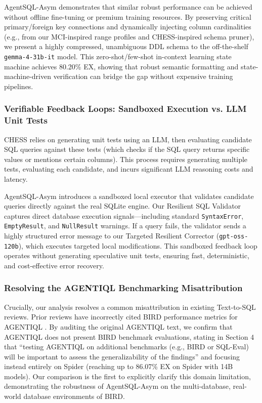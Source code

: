 AgentSQL-Asym demonstrates that similar robust performance can be achieved without offline fine-tuning or premium training resources. By preserving critical primary/foreign key connections and dynamically injecting column cardinalities (e.g., from our MCI-inspired range profiles and CHESS-inspired schema pruner), we present a highly compressed, unambiguous DDL schema to the off-the-shelf \texttt{gemma-4-31b-it} model. This zero-shot/few-shot in-context learning state machine achieves 80.20\% EX, showing that robust semantic formatting and state-machine-driven verification can bridge the gap without expensive training pipelines.

\subsubsection{Verifiable Feedback Loops: Sandboxed Execution vs. LLM Unit Tests}
CHESS \cite{talaei_chess_2024} relies on generating unit tests using an LLM, then evaluating candidate SQL queries against these tests (which checks if the SQL query returns specific values or mentions certain columns). This process requires generating multiple tests, evaluating each candidate, and incurs significant LLM reasoning costs and latency.

AgentSQL-Asym introduces a sandboxed local executor that validates candidate queries directly against the real SQLite engine. Our Resilient SQL Validator captures direct database execution signals---including standard \texttt{SyntaxError}, \texttt{EmptyResult}, and \texttt{NullResult} warnings. If a query fails, the validator sends a highly structured error message to our Targeted Resilient Corrector (\texttt{gpt-oss-120b}), which executes targeted local modifications. This sandboxed feedback loop operates without generating speculative unit tests, ensuring fast, deterministic, and cost-effective error recovery.

\subsubsection{Resolving the AGENTIQL Benchmarking Misattribution}
Crucially, our analysis resolves a common misattribution in existing Text-to-SQL reviews. Prior reviews have incorrectly cited BIRD performance metrics for AGENTIQL \cite{heidari_agentiql_2025}. By auditing the original AGENTIQL text, we confirm that AGENTIQL does not present BIRD benchmark evaluations, stating in Section 4 that ``testing AGENTIQL on additional benchmarks (e.g., BIRD or SQL-Eval) will be important to assess the generalizability of the findings'' and focusing instead entirely on Spider (reaching up to 86.07\% EX on Spider with 14B models). Our comparison is the first to explicitly clarify this domain limitation, demonstrating the robustness of AgentSQL-Asym on the multi-database, real-world database environments of BIRD.

